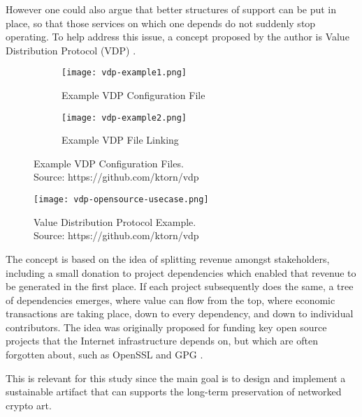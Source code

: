 However one could also argue that better structures of support can be put in place, so that those services on which one depends do not suddenly stop operating. To help address this issue, a concept proposed by the author is Value Distribution Protocol (VDP) \cite{HackcoinHongKong2015} \cite{farinhaGrokyaPrivacyFriendlyFramework2016}.


\begin{figure}[H]
  \centering
  \captionsetup{justification=centering}
  \begin{subfigure}[b]{0.45\textwidth}
    \centering
    \texttt{[image: vdp-example1.png]}
    \caption{Example VDP Configuration File}
    \label{fig:vdp1}
  \end{subfigure}
  \hfill
  \begin{subfigure}[b]{0.45\textwidth}
    \centering
    \texttt{[image: vdp-example2.png]}
    \caption{Example VDP File Linking}
    \label{fig:vdp2}
  \end{subfigure}
  \caption[Example VDP Configuration Files]{Example VDP Configuration Files. \\ Source: https://github.com/ktorn/vdp}
  \label{fig:vdp-examples}
\end{figure}


\begin{figure}[h]
    \centering
    \captionsetup{justification=centering}
    \texttt{[image: vdp-opensource-usecase.png]}
    \captionsetup{justification=centering}
    \caption[Value Distribution Protocol Example]{Value Distribution Protocol Example. \\ Source: https://github.com/ktorn/vdp}
    \label{fig:vdp}
\end{figure}

The concept is based on the idea of splitting revenue amongst stakeholders, including a small donation to project dependencies which enabled that revenue to be generated in the first place. If each project subsequently does the same, a tree of dependencies emerges, where value can flow from the top, where economic transactions are taking place, down to every dependency, and down to individual contributors. The idea was originally proposed for funding key open source projects that the Internet infrastructure depends on, but which are often forgotten about, such as OpenSSL and GPG \cite{oberhausInternetWasBuilt2019}.

This is relevant for this study since the main goal is to design and implement a sustainable artifact that can supports the long-term preservation of networked crypto art.

